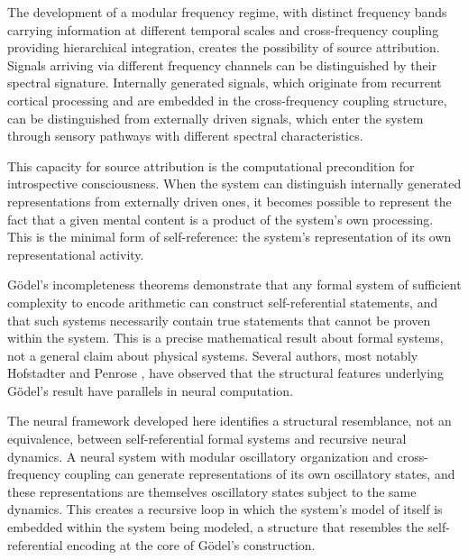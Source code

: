 \documentclass[12pt,a4paper]{article}
\makeatletter
\let\orig@subsection\subsection
\renewcommand{\subsection}{\@ifstar{\orig@subsection*}{\@dblarg{\my@subsection}}}
\def\my@subsection[#1]#2{\orig@subsection[#1]{#2}\noindent\@afterindentfalse\@afterheading}
\makeatother
\begin{document}
The development of a modular frequency regime, with distinct frequency bands carrying information at different temporal scales and cross-frequency coupling providing hierarchical integration, creates the possibility of source attribution.
Signals arriving via different frequency channels can be distinguished by their spectral signature.
Internally generated signals, which originate from recurrent cortical processing and are embedded in the cross-frequency coupling structure, can be distinguished from externally driven signals, which enter the system through sensory pathways with different spectral characteristics.

This capacity for source attribution is the computational precondition for introspective consciousness.
When the system can distinguish internally generated representations from externally driven ones, it becomes possible to represent the fact that a given mental content is a product of the system's own processing.
This is the minimal form of self-reference: the system's representation of its own representational activity.

\subsection{Recursive Self-Reference and G\"odel-Type Structure}

G\"odel's incompleteness theorems \cite{Godel1931} demonstrate that any formal system of sufficient complexity to encode arithmetic can construct self-referential statements, and that such systems necessarily contain true statements that cannot be proven within the system.
This is a precise mathematical result about formal systems, not a general claim about physical systems.
Several authors, most notably Hofstadter \cite{Hofstadter1979} and Penrose \cite{Penrose1989}, have observed that the structural features underlying G\"odel's result have parallels in neural computation.

The neural framework developed here identifies a structural resemblance, not an equivalence, between self-referential formal systems and recursive neural dynamics.
A neural system with modular oscillatory organization and cross-frequency coupling can generate representations of its own oscillatory states, and these representations are themselves oscillatory states subject to the same dynamics.
This creates a recursive loop in which the system's model of itself is embedded within the system being modeled, a structure that resembles the self-referential encoding at the core of G\"odel's construction.
\end{document}
